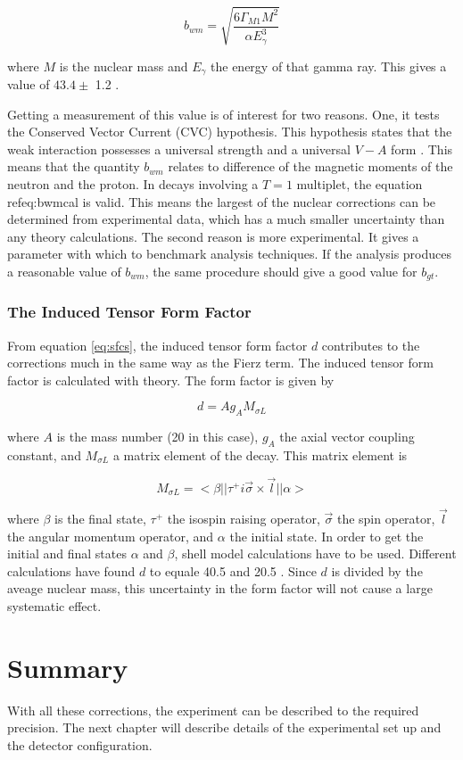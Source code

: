 \documentclass[../MaxHughesThesis.tex]{subfiles}
\begin{document}
\begin{equation}
	b_{wm} = \sqrt{\frac{6\Gamma_{M1}M^{2}}{\alpha E_{\gamma}^{3}}}
	\label{eq:bwmcal}
\end{equation}

where $M$ is the nuclear mass and $E_{\gamma}$ the energy of that gamma ray.
This gives a value of $43.4 \pm$ 1.2 \cite{Min11}.

Getting a measurement of this value is of interest for two reasons.
One, it tests the Conserved Vector Current (CVC) hypothesis.
This hypothesis states that the weak interaction possesses a universal strength and a universal $V-A$ form \cite{Man58}.
This means that the quantity $b_{wm}$ relates to difference of the magnetic moments of the neutron and the proton.
In decays involving a $T = 1$ multiplet, the equation ref{eq:bwmcal} is valid. 
This means the largest of the nuclear corrections can be determined from experimental data, which has a much smaller uncertainty than any theory calculations.
The second reason is more experimental.
It gives a parameter with which to benchmark analysis techniques.
If the analysis produces a reasonable value of $b_{wm}$, the same procedure should give a good value for $b_{gt}$.

\subsubsection{The Induced Tensor Form Factor}
From equation \ref{eq:sfcs}, the induced tensor form factor $d$ contributes to the corrections much in the same way as the Fierz term.
The induced tensor form factor is calculated with theory.
The form factor is given by \cite{Cal77}

\begin{equation}
	d = A g_{A} M_{\sigma L}
	\label{eq:tensorformfactor}
\end{equation} 

where $A$ is the mass number (20 in this case), $g_{A}$ the axial vector coupling constant, and $M_{\sigma L}$ a matrix element of the decay.
This matrix element is 

\begin{equation}
	M_{\sigma L} = < \beta || \tau^{+} i \vec{\sigma} \times \vec{l} || \alpha >
	\label{eq:dmatrix}
\end{equation}

where $\beta$ is the final state, $\tau^{+}$ the isospin raising operator, $\vec{\sigma}$ the spin operator, $\vec{l}$ the angular momentum operator, and $\alpha$ the initial state. \cite{Cal77}
In order to get the initial and final states $\alpha$ and $\beta$, shell model calculations have to be used.
Different calculations have found $d$ to equale 40.5 \cite{Cal77} and 20.5 \cite{Min11}.
Since $d$ is divided by the aveage nuclear mass, this uncertainty in the form factor will not cause a large systematic effect.

\section{Summary}
With all these corrections, the experiment can be described to the required precision.
The next chapter will describe details of the experimental set up and the detector configuration.
\end{document}
